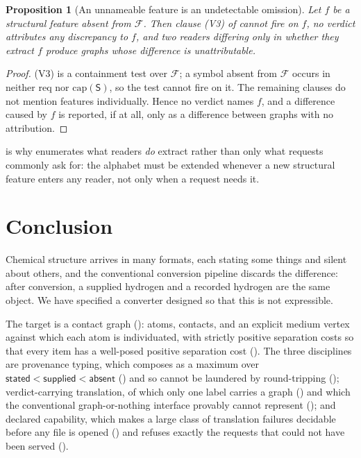 \documentclass[11pt,twocolumn,a4paper]{article}
\theoremstyle{msthm}
\newtheorem{proposition}[theorem]{Proposition}
\theoremstyle{definition}
\theoremstyle{remark}
\newcommand{\Src}{\mathsf{S}}
\newcommand{\Feat}{\mathcal{F}}
\newcommand{\Capset}{\mathrm{cap}}
\newcommand{\Req}{\mathrm{req}}
\newcommand{\stated}{\textsf{stated}}
\newcommand{\supplied}{\textsf{supplied}}
\newcommand{\absent}{\textsf{absent}}
\begin{document}
\begin{proposition}[An unnameable feature is an undetectable omission]
\label{prop:nameable-analogue}
Let $f$ be a structural feature absent from $\Feat$. Then clause (V3) of
 cannot fire on $f$, no verdict attributes any
discrepancy to $f$, and two readers differing only in whether they
extract $f$ produce graphs whose difference is unattributable.
\end{proposition}

\begin{proof}
(V3) is a containment test over $\Feat$; a symbol absent from $\Feat$
occurs in neither $\Req$ nor $\Capset(\Src)$, so the test cannot fire on
it. The remaining clauses do not mention features individually. Hence no
verdict names $f$, and a difference caused by $f$ is reported, if at
all, only as a difference between graphs with no attribution.
\end{proof}

 is why  enumerates what
readers \emph{do} extract rather than only what requests commonly ask
for: the alphabet must be extended whenever a new structural feature
enters any reader, not only when a request needs it.

\section{Conclusion}
\label{sec:conclusion}

Chemical structure arrives in many formats, each stating some things and
silent about others, and the conventional conversion pipeline discards
the difference: after conversion, a supplied hydrogen and a recorded
hydrogen are the same object. We have specified a converter designed so
that this is not expressible.

The target is a contact graph (): atoms, contacts, and
an explicit medium vertex against which each atom is individuated, with
strictly positive separation costs so that every item has a well-posed
positive separation cost (). The three disciplines
are provenance typing, which composes as a maximum over
$\stated<\supplied<\absent$ () and so cannot be
laundered by round-tripping (); verdict-carrying
translation, of which only one label carries a graph
() and which the conventional graph-or-nothing
interface provably cannot represent (); and
declared capability, which makes a large class of translation failures
decidable before any file is opened () and refuses
exactly the requests that could not have been served
().
\end{document}
